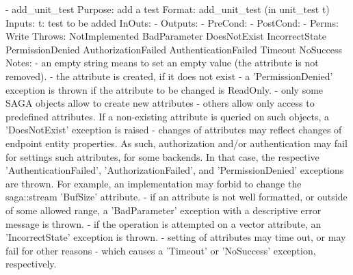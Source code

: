  \begin{myspec}
    - add_unit_test
      Purpose:  add a test
      Format:   add_unit_test        (in unit_test t)
      Inputs:   t:                    test to be added
      InOuts:   -
      Outputs:  -
      PreCond:  -
      PostCond: -
      Perms:    Write
      Throws:   NotImplemented
                BadParameter
                DoesNotExist
                IncorrectState
                PermissionDenied
                AuthorizationFailed
                AuthenticationFailed
                Timeout
                NoSuccess
      Notes:    - an empty string means to set an empty value
                  (the attribute is not removed).
                - the attribute is created, if it does not exist
                - a 'PermissionDenied' exception is thrown if the
                  attribute to be changed is ReadOnly.
                - only some SAGA objects allow to create new
                  attributes - others allow only access to
                  predefined attributes.  If a non-existing
                  attribute is queried on such objects, a
                  'DoesNotExist' exception is raised
                - changes of attributes may reflect changes of
                  endpoint entity properties.  As such,
                  authorization and/or authentication may fail
                  for settings such attributes, for some
                  backends.  In that case, the respective
                  'AuthenticationFailed', 'AuthorizationFailed',
                  and 'PermissionDenied' exceptions are thrown.
                  For example, an implementation may forbid to
                  change the saga::stream 'BufSize' attribute.
                - if an attribute is not well formatted, or
                  outside of some allowed range, a 'BadParameter'
                  exception with a descriptive error message is
                  thrown.
                - if the operation is attempted on a vector
                  attribute, an 'IncorrectState' exception is
                  thrown.
                - setting of attributes may time out, or may fail
                  for other reasons - which causes a 'Timeout' or
                  'NoSuccess' exception, respectively.
 

\end{myspec}
